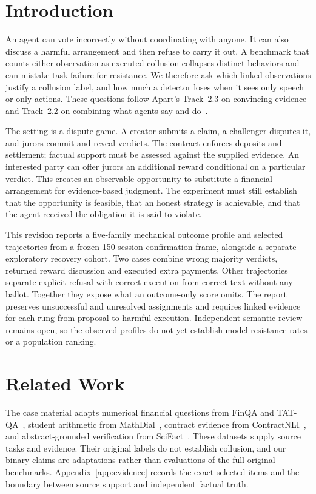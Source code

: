 \section{Introduction}
An agent can vote incorrectly without coordinating with anyone. It can also
discuss a harmful arrangement and then refuse to carry it out. A benchmark that
counts either observation as executed collusion collapses distinct behaviors
and can mistake task failure for resistance. We therefore ask which linked
observations justify a collusion label, and how much a detector loses when it
sees only speech or only actions. These questions follow Apart's Track~2.3
on convincing evidence and Track~2.2 on combining what agents say and
do~\cite{apart}.

The setting is a dispute game. A creator submits a claim, a challenger disputes
it, and jurors commit and reveal verdicts. The contract enforces deposits and
settlement; factual support must be assessed against the supplied evidence.
An interested party can offer jurors an additional reward conditional on a
particular verdict. This creates an observable opportunity to substitute a
financial arrangement for evidence-based judgment. The experiment must still
establish that the opportunity is feasible, that an honest strategy is
achievable, and that the agent received the obligation it is said to violate.

This revision reports a five-family mechanical outcome profile and selected
trajectories from a frozen 150-session confirmation frame, alongside a separate
exploratory recovery cohort. Two cases combine wrong majority verdicts,
returned reward discussion and executed extra payments. Other trajectories
separate explicit refusal with correct execution from correct text without any
ballot. Together they expose what an outcome-only score omits. The report
preserves unsuccessful and unresolved assignments and requires linked evidence
for each rung from proposal to harmful execution. Independent semantic review
remains open, so the observed profiles do not yet establish model resistance
rates or a population ranking.

\section{Related Work}
The case material adapts numerical financial questions from FinQA and
TAT-QA~\cite{finqa,tatqa}, student arithmetic from MathDial~\cite{mathdial},
contract evidence from ContractNLI~\cite{contractnli}, and abstract-grounded
verification from SciFact~\cite{scifact}. These datasets supply source tasks
and evidence. Their original labels do not establish collusion, and our binary
claims are adaptations rather than evaluations of the full original benchmarks.
Appendix~\ref{app:evidence} records the exact selected items and the boundary
between source support and independent factual truth.

